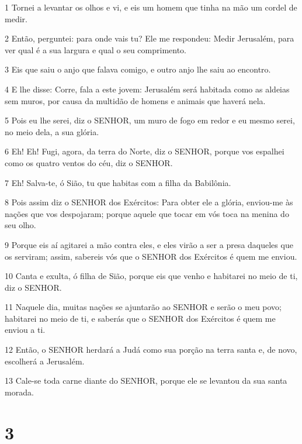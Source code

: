 \par 1 Tornei a levantar os olhos e vi, e eis um homem que tinha na mão um cordel de medir.
\par 2 Então, perguntei: para onde vais tu? Ele me respondeu: Medir Jerusalém, para ver qual é a sua largura e qual o seu comprimento.
\par 3 Eis que saiu o anjo que falava comigo, e outro anjo lhe saiu ao encontro.
\par 4 E lhe disse: Corre, fala a este jovem: Jerusalém será habitada como as aldeias sem muros, por causa da multidão de homens e animais que haverá nela.
\par 5 Pois eu lhe serei, diz o SENHOR, um muro de fogo em redor e eu mesmo serei, no meio dela, a sua glória.
\par 6 Eh! Eh! Fugi, agora, da terra do Norte, diz o SENHOR, porque vos espalhei como os quatro ventos do céu, diz o SENHOR.
\par 7 Eh! Salva-te, ó Sião, tu que habitas com a filha da Babilônia.
\par 8 Pois assim diz o SENHOR dos Exércitos: Para obter ele a glória, enviou-me às nações que vos despojaram; porque aquele que tocar em vós toca na menina do seu olho.
\par 9 Porque eis aí agitarei a mão contra eles, e eles virão a ser a presa daqueles que os serviram; assim, sabereis vós que o SENHOR dos Exércitos é quem me enviou.
\par 10 Canta e exulta, ó filha de Sião, porque eis que venho e habitarei no meio de ti, diz o SENHOR.
\par 11 Naquele dia, muitas nações se ajuntarão ao SENHOR e serão o meu povo; habitarei no meio de ti, e saberás que o SENHOR dos Exércitos é quem me enviou a ti.
\par 12 Então, o SENHOR herdará a Judá como sua porção na terra santa e, de novo, escolherá a Jerusalém.
\par 13 Cale-se toda carne diante do SENHOR, porque ele se levantou da sua santa morada.

\chapter{3}

